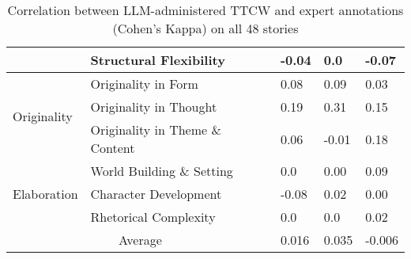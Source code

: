 \begin{table*}[!ht]
\begin{tabular}{ll|lll|}
\multicolumn{1}{|l|}{}                             & Structural Flexibility                                                             & \multicolumn{1}{l|}{-0.04}  & \multicolumn{1}{l|}{0.0}   &  -0.07                                                   \\ \hline\hline
\multicolumn{1}{|l|}{\multirow{3}{*}{Originality}}                             & Originality in Form                                                             & \multicolumn{1}{l|}{0.08}   & \multicolumn{1}{l|}{0.09}  &  0.03                                                         \\ \cline{2-5} 
\multicolumn{1}{|l|}{}                             & Originality in Thought                                                             & \multicolumn{1}{l|}{0.19}   & \multicolumn{1}{l|}{0.31}  &  0.15                                                          \\ \cline{2-5} 
\multicolumn{1}{|l|}{}                             & Originality in Theme \& Content                                                    & \multicolumn{1}{l|}{0.06}   & \multicolumn{1}{l|}{-0.01} &  0.18                                                        \\ \hline\hline
\multicolumn{1}{|l|}{\multirow{3}{*}{Elaboration}} & World Building \& Setting                                                          & \multicolumn{1}{l|}{0.0}   & \multicolumn{1}{l|}{0.00}  &  0.09                                                            \\ \cline{2-5} 
\multicolumn{1}{|l|}{}                             & Character Development                                                              & \multicolumn{1}{l|}{-0.08}  & \multicolumn{1}{l|}{0.02}  &  0.00                                                          \\ \cline{2-5} 
\multicolumn{1}{|l|}{}                             & Rhetorical Complexity                                                              & \multicolumn{1}{l|}{0.0}    & \multicolumn{1}{l|}{0.0}   &  0.02                                                          \\ \hline\hline
\multicolumn{2}{|c|}{Average}                                                                                                           & \multicolumn{1}{l|}{0.016}   & \multicolumn{1}{l|}{0.035}  & -0.006                                                     \\ \hline
\end{tabular}
\vspace{2ex}
\caption{\label{llmhumancor} Correlation between LLM-administered TTCW and expert annotations (Cohen's Kappa) on all 48 stories}
\vspace{-3ex}
\end{table*}

